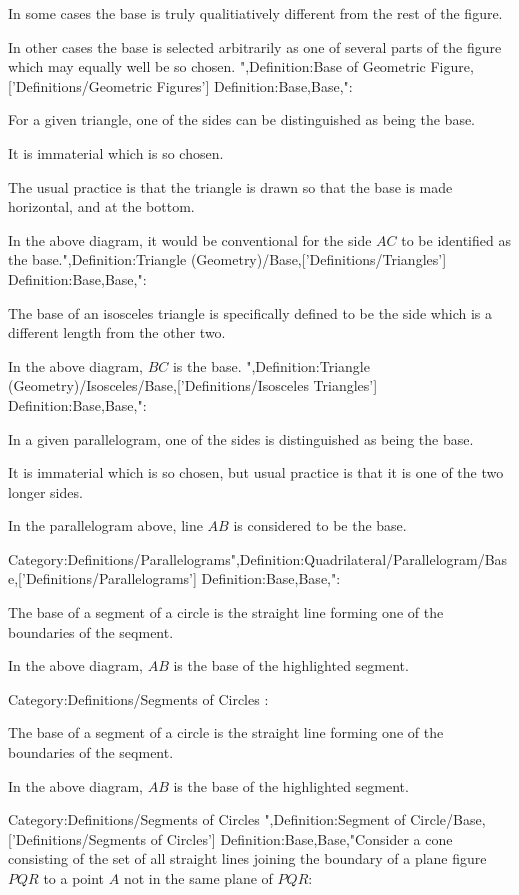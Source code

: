 In some cases the base is truly qualitiatively different from the rest of the figure.

In other cases the base is selected arbitrarily as one of several parts of the figure which may equally well be so chosen.
",Definition:Base of Geometric Figure,['Definitions/Geometric Figures']
Definition:Base,Base,":


For a given triangle, one of the sides can be distinguished as being the base.

It is immaterial which is so chosen.

The usual practice is that the triangle is drawn so that the base is made horizontal, and at the bottom.

In the above diagram, it would be conventional for the side $AC$ to be identified as the base.",Definition:Triangle (Geometry)/Base,['Definitions/Triangles']
Definition:Base,Base,":


The base of an isosceles triangle is specifically defined to be the side which is a different length from the other two.

In the above diagram, $BC$ is the base.
",Definition:Triangle (Geometry)/Isosceles/Base,['Definitions/Isosceles Triangles']
Definition:Base,Base,":

In a given parallelogram, one of the sides is distinguished as being the base.

It is immaterial which is so chosen, but usual practice is that it is one of the two longer sides.

In the parallelogram above, line $AB$ is considered to be the base.


Category:Definitions/Parallelograms",Definition:Quadrilateral/Parallelogram/Base,['Definitions/Parallelograms']
Definition:Base,Base,":

The base of a segment of a circle is the straight line forming one of the boundaries of the seqment.

In the above diagram, $AB$ is the base of the highlighted segment.


Category:Definitions/Segments of Circles
:

The base of a segment of a circle is the straight line forming one of the boundaries of the seqment.

In the above diagram, $AB$ is the base of the highlighted segment.


Category:Definitions/Segments of Circles
",Definition:Segment of Circle/Base,['Definitions/Segments of Circles']
Definition:Base,Base,"Consider a cone consisting of the set of all straight lines joining the boundary of a plane figure $PQR$ to a point $A$ not in the same plane of $PQR$:


